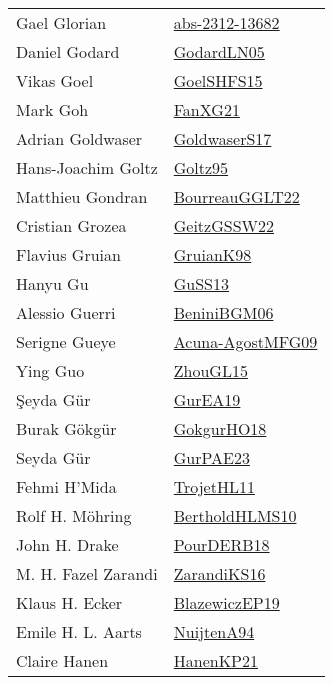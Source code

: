 {\begin{longtable}{p{4cm}p{20cm}}
Gael Glorian & \href{articles/abs-2312-13682.pdf}{abs-2312-13682}\cite{abs-2312-13682} \\
Daniel Godard & \href{}{GodardLN05}\cite{GodardLN05} \\
Vikas Goel & \href{articles/GoelSHFS15.pdf}{GoelSHFS15}\cite{GoelSHFS15} \\
Mark Goh & \href{articles/FanXG21.pdf}{FanXG21}\cite{FanXG21} \\
Adrian Goldwaser & \href{papers/GoldwaserS17.pdf}{GoldwaserS17}\cite{GoldwaserS17} \\
Hans{-}Joachim Goltz & \href{papers/Goltz95.pdf}{Goltz95}\cite{Goltz95} \\
Matthieu Gondran & \href{articles/BourreauGGLT22.pdf}{BourreauGGLT22}\cite{BourreauGGLT22} \\
Cristian Grozea & \href{papers/GeitzGSSW22.pdf}{GeitzGSSW22}\cite{GeitzGSSW22} \\
Flavius Gruian & \href{papers/GruianK98.pdf}{GruianK98}\cite{GruianK98} \\
Hanyu Gu & \href{papers/GuSS13.pdf}{GuSS13}\cite{GuSS13} \\
Alessio Guerri & \href{papers/BeniniBGM06.pdf}{BeniniBGM06}\cite{BeniniBGM06} \\
Serigne Gueye & \href{papers/Acuna-AgostMFG09.pdf}{Acuna-AgostMFG09}\cite{Acuna-AgostMFG09} \\
Ying Guo & \href{papers/ZhouGL15.pdf}{ZhouGL15}\cite{ZhouGL15} \\
Şeyda G{\"u}r & \href{articles/GurEA19.pdf}{GurEA19}\cite{GurEA19} \\
Burak G{\"{o}}kg{\"{u}}r & \href{}{GokgurHO18}\cite{GokgurHO18} \\
Seyda G{\"{u}}r & \href{articles/GurPAE23.pdf}{GurPAE23}\cite{GurPAE23} \\
Fehmi H'Mida & \href{articles/TrojetHL11.pdf}{TrojetHL11}\cite{TrojetHL11} \\
Rolf H. M{\"{o}}hring & \href{papers/BertholdHLMS10.pdf}{BertholdHLMS10}\cite{BertholdHLMS10} \\
John H. Drake & \href{articles/PourDERB18.pdf}{PourDERB18}\cite{PourDERB18} \\
M. H. Fazel Zarandi & \href{articles/ZarandiKS16.pdf}{ZarandiKS16}\cite{ZarandiKS16} \\
Klaus H. Ecker & \href{}{BlazewiczEP19}\cite{BlazewiczEP19} \\
Emile H. L. Aarts & \href{}{NuijtenA94}\cite{NuijtenA94} \\
Claire Hanen & \href{papers/HanenKP21.pdf}{HanenKP21}\cite{HanenKP21} \\

\end{longtable}}
